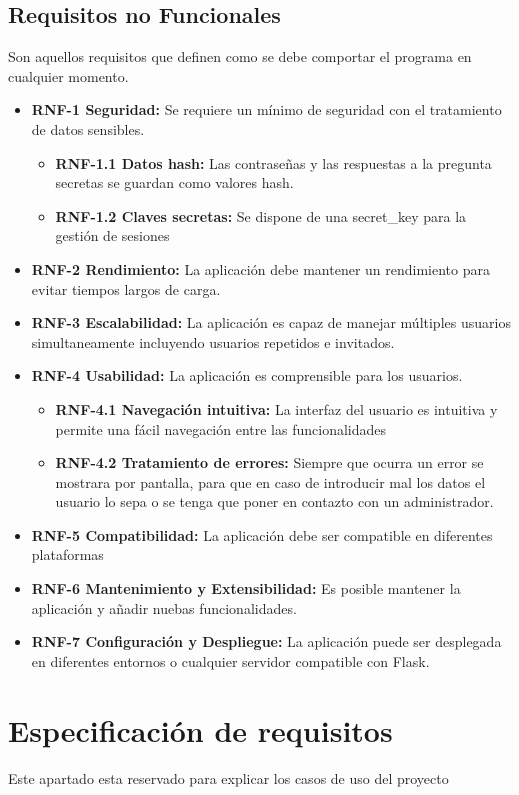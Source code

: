 \subsection{Requisitos no Funcionales}
Son aquellos requisitos que definen como se debe comportar el programa en cualquier momento.
\begin{itemize}
    \item \textbf{RNF-1 Seguridad:} Se requiere un mínimo de seguridad con el tratamiento de datos sensibles.
    \begin{itemize}
        \item \textbf{RNF-1.1 Datos hash:} Las contraseñas y las respuestas a la pregunta secretas se guardan como valores hash.
        \item \textbf{RNF-1.2 Claves secretas:} Se dispone de una secret\_key para la gestión de sesiones
    \end{itemize}
    \item \textbf{RNF-2 Rendimiento:} La aplicación debe mantener un rendimiento para evitar tiempos largos de carga.
    \item \textbf{RNF-3 Escalabilidad:} La aplicación es capaz de manejar múltiples usuarios simultaneamente incluyendo usuarios repetidos e invitados.
    \item \textbf{RNF-4 Usabilidad:} La aplicación es comprensible para los usuarios.
    \begin{itemize}
        \item \textbf{RNF-4.1 Navegación intuitiva:} La interfaz del usuario es intuitiva y permite una fácil navegación entre las funcionalidades
        \item \textbf{RNF-4.2 Tratamiento de errores:} Siempre que ocurra un error se mostrara por pantalla, para que en caso de introducir mal los datos el usuario lo sepa o se tenga que poner en contazto con un administrador.
    \end{itemize}
    \item \textbf{RNF-5 Compatibilidad:} La aplicación debe ser compatible en diferentes plataformas
    \item \textbf{RNF-6 Mantenimiento y Extensibilidad:} Es posible mantener la aplicación y añadir nuebas funcionalidades.
    \item \textbf{RNF-7 Configuración y Despliegue:} La aplicación puede ser desplegada en diferentes entornos o cualquier servidor compatible con Flask.
\end{itemize}
\section{Especificación de requisitos}
Este apartado esta reservado para explicar los casos de uso del proyecto
